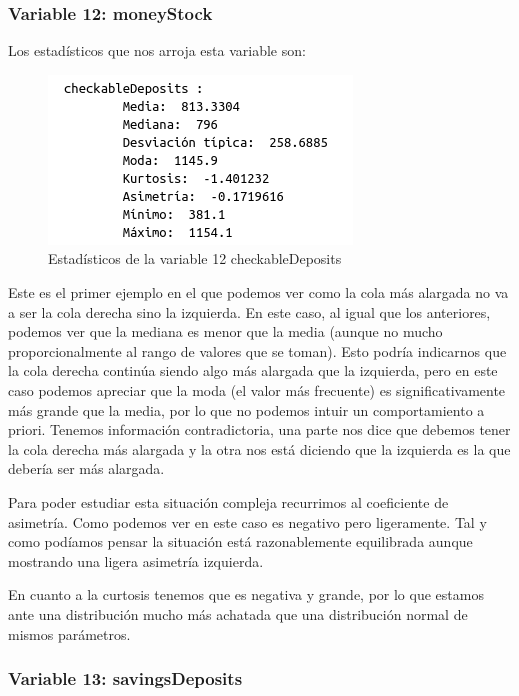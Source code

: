 \documentclass[12pt,a4paper]{article}
\begin{document}
\subsubsection*{Variable 12: moneyStock}

Los estadísticos que nos arroja esta variable son:

\begin{figure}[H]
	\centering
	\includegraphics[scale=0.7]{./Imagenes/EDA/Regresion/estadisticos_checkableDeposits.png}
	\caption{Estadísticos de la variable 12 checkableDeposits}
\end{figure}

Este es el primer ejemplo en el que podemos ver como la cola más alargada no va a ser la cola derecha sino la izquierda. En este caso, al igual que los anteriores, podemos ver que la mediana es menor que la media (aunque no mucho proporcionalmente al rango de valores que se toman). Esto podría indicarnos que la cola derecha continúa siendo algo más alargada que la izquierda, pero en este caso podemos apreciar que la moda (el valor más frecuente) es significativamente más grande que la media, por lo que no podemos intuir un comportamiento a priori. Tenemos información contradictoria, una parte nos dice que debemos tener la cola derecha más alargada y la otra nos está diciendo que la izquierda es la que debería ser más alargada.

Para poder estudiar esta situación compleja recurrimos al coeficiente de asimetría. Como podemos ver en este caso es negativo pero ligeramente. Tal y como podíamos pensar la situación está razonablemente equilibrada aunque mostrando una ligera asimetría izquierda.

En cuanto a la curtosis tenemos que es negativa y grande, por lo que estamos ante una distribución mucho más achatada que una distribución normal de mismos parámetros.

\subsubsection*{Variable 13: savingsDeposits}
\end{document}

